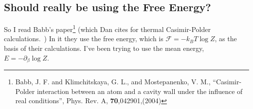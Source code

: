 \subsection{Should really be using the Free Energy?}

So I read Babb's paper\footnote{Babb, J. F. and Klimchitskaya, G. L., and Mostepanenko, V. M., 
``Casimir-Polder interaction between an atom and a cavity wall under the influence of real conditions'',
 Phys. Rev. A, \textbf{70},042901,(2004)} (which Dan cites for thermal Casimir-Polder calculations.~\cite{Babb2004})
  In it they use the free energy, which is $\mathcal{F} = -k_BT\log Z$, as the basis of their calculations.
  I've been trying to use the mean energy, $E= -\partial_\beta\log Z$. 






